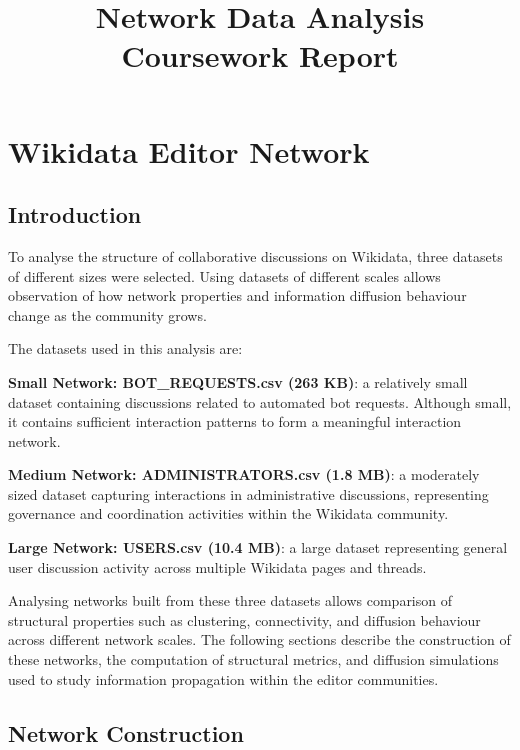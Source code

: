 \documentclass[conference]{IEEEtran}
\title{Network Data Analysis Coursework Report}
\author{
\IEEEauthorblockN{Kunal Godara }
\IEEEauthorblockA{
K-Number: K25057852 \\
Repository: \url{https://github.com/kunalsgodara/Network-data} 
}
}
\begin{document}
\maketitle

\section{Wikidata Editor Network}

\subsection{Introduction}

To analyse the structure of collaborative discussions on Wikidata, three datasets of different sizes were selected. Using datasets of different scales allows observation of how network properties and information diffusion behaviour change as the community grows.

The datasets used in this analysis are:

\textbf{Small Network: BOT\_REQUESTS.csv (263 KB)}: a relatively small dataset containing discussions related to automated bot requests. Although small, it contains sufficient interaction patterns to form a meaningful interaction network.

\textbf{Medium Network: ADMINISTRATORS.csv (1.8 MB)}: a moderately sized dataset capturing interactions in administrative discussions, representing governance and coordination activities within the Wikidata community.

\textbf{Large Network: USERS.csv (10.4 MB)}: a large dataset representing general user discussion activity across multiple Wikidata pages and threads.

Analysing networks built from these three datasets allows comparison of structural properties such as clustering, connectivity, and diffusion behaviour across different network scales. The following sections describe the construction of these networks, the computation of structural metrics, and diffusion simulations used to study information propagation within the editor communities.

\subsection{Network Construction}
\end{document}
